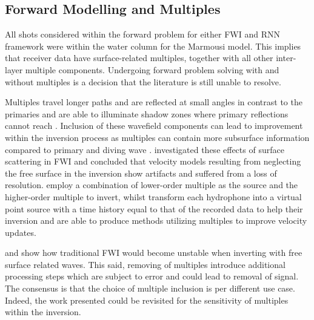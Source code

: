 
\subsection{Forward Modelling and Multiples}
All shots considered within the forward problem for either FWI and RNN framework were within the water column for the Marmousi model. This implies that receiver data have surface-related multiples, together with all other inter-layer multiple components. Undergoing forward problem solving with and without multiples is a decision that the literature is still unable to resolve. 

Multiples travel longer paths and are reflected at small angles in contrast to the primaries and are able to illuminate shadow zones where primary reflections cannot reach \citep{Bergen2019}. Inclusion of these wavefield components can lead to improvement within the inversion process as multiples can contain more subsurface information compared to primary and diving wave \citep{Komatitsch2002}. \cite{Bleibinhaus2009} investigated these effects of surface scattering in FWI and concluded that velocity models resulting from neglecting the free surface in the inversion show artifacts and suffered from a loss of resolution. \cite{Liu2020} employ a combination of lower-order multiple as the source and the higher-order multiple to invert, whilst \cite{Zhang2013} transform each hydrophone into a virtual point source with a time history equal to that of the recorded data to help their inversion and are able to produce methods utilizing multiples to improve velocity updates. 

\cite{Hicks2001} and \cite{Operto2006} show how traditional FWI would become unstable when inverting with free surface related waves. This said, removing of multiples introduce additional processing steps which are subject to error and could lead to removal of signal. The consensus is that the choice of multiple inclusion is per different use case. Indeed, the work presented could be revisited for the sensitivity of multiples within the inversion.


